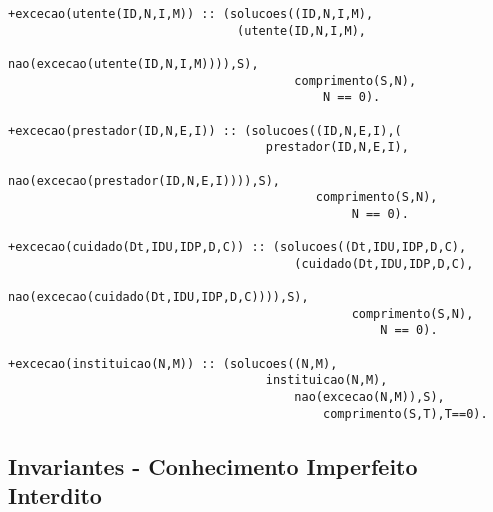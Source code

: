 \documentclass{report}
\begin{document}
\begin{verbatim}
+excecao(utente(ID,N,I,M)) :: (solucoes((ID,N,I,M),
                                (utente(ID,N,I,M),
                                    nao(excecao(utente(ID,N,I,M)))),S),
                                        comprimento(S,N),
                                            N == 0). 

+excecao(prestador(ID,N,E,I)) :: (solucoes((ID,N,E,I),(
                                    prestador(ID,N,E,I),
                                        nao(excecao(prestador(ID,N,E,I)))),S),
                                           comprimento(S,N),
                                                N == 0). 

+excecao(cuidado(Dt,IDU,IDP,D,C)) :: (solucoes((Dt,IDU,IDP,D,C),
                                        (cuidado(Dt,IDU,IDP,D,C),
                                            nao(excecao(cuidado(Dt,IDU,IDP,D,C)))),S),
                                                comprimento(S,N),
                                                    N == 0).

+excecao(instituicao(N,M)) :: (solucoes((N,M),
                                    instituicao(N,M),
                                        nao(excecao(N,M)),S),
                                            comprimento(S,T),T==0).
\end{verbatim}


\subsection{Invariantes - Conhecimento Imperfeito Interdito}
\end{document}
